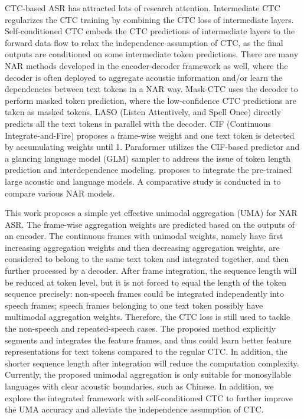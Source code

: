 \documentclass{article}
\begin{document}
CTC-based ASR has attracted lots of research attention. Intermediate CTC \cite{lee2021intermediate} regularizes the CTC training by combining the CTC loss of intermediate layers. Self-conditioned CTC \cite{nozaki2021relaxing} embeds the CTC predictions of intermediate layers to the forward data flow to relax the independence assumption of CTC, as the final outputs are conditioned on some intermediate token predictions. 
There are many NAR methods developed in the encoder-decoder framework as well, where the decoder is often deployed to aggregate acoustic information and/or learn the dependencies between text tokens in a NAR way. Mask-CTC \cite{higuchi2020mask} uses the decoder to perform masked token prediction, where the low-confidence CTC predictions are taken as masked tokens. LASO (Listen Attentively, and Spell Once) \cite{bai2021fast} directly predicts all the text tokens in parallel with the decoder. CIF (Continuous Integrate-and-Fire) \cite{dong2020cif} proposes a frame-wise weight
and one text token is detected by accumulating weights until 1. Paraformer \cite{Gao2022ParaformerFA} utilizes the CIF-based predictor and a glancing language model (GLM) sampler to address the issue of token length prediction and interdependence modeling.  \cite{deng2022improving} proposes to integrate the pre-trained large acoustic and language models.
A comparative study is conducted in \cite{higuchi2021comparative} to compare various NAR models.




This work proposes a simple yet effective unimodal aggregation (UMA) for NAR ASR. 
The frame-wise aggregation weights are predicted based on the outputs of an encoder. The continuous frames with unimodal weights, namely have first increasing aggregation weights and then decreasing aggregation weights, are considered to belong to the same text token and integrated together, and then further processed by a decoder. After frame integration, the sequence length will be reduced at token level, but it is not forced to equal the length of the token sequence precisely: non-speech frames could be integrated independently into speech frames; speech frames belonging to one text token possibly have multimodal aggregation weights. Therefore, the CTC loss is still used to tackle the non-speech and repeated-speech cases. 
The proposed method explicitly segments and integrates the feature frames, and thus could learn better feature representations for text tokens compared to the regular CTC. 
In addition, the shorter sequence length after integration will reduce the computation complexity. 
Currently, the proposed unimodal aggregation is only suitable for monosyllable languages with clear acoustic boundaries, such as Chinese. 
In addition, we explore the integrated framework with self-conditioned CTC \cite{nozaki2021relaxing} to further improve the UMA accuracy and alleviate the independence assumption of CTC.
\end{document}
